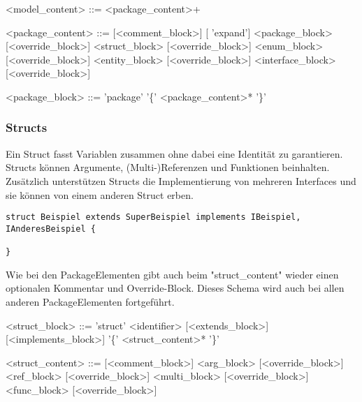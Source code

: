 \documentclass[./einleitung.tex]{subfiles}
\begin{document}
\begin{grammar}
<model_content> ::= <package_content>+

<package_content> ::= [<comment_block>] [ 'expand'] <package_block> [<override_block>]
 <struct_block> [<override_block>]
 <enum_block> [<override_block>]
 <entity_block> [<override_block>]
 <interface_block> [<override_block>]

<package_block> ::= 'package' '\{' <package_content>* '\}'
\end{grammar}

\subsubsection{Structs} Ein Struct fasst Variablen zusammen ohne dabei eine Identität zu garantieren. Structs können Argumente, (Multi-)Referenzen und Funktionen beinhalten.
Zusätzlich unterstützen Structs die Implementierung von mehreren Interfaces und sie können von einem anderen Struct erben.
\begin{lstlisting}
struct Beispiel extends SuperBeispiel implements IBeispiel, IAnderesBeispiel {

}
\end{lstlisting}
Wie bei den PackageElementen gibt auch beim "struct_content" wieder einen optionalen Kommentar und Override-Block. Dieses Schema wird auch bei allen anderen PackageElementen fortgeführt.
\begin{grammar}
<struct_block> ::= 'struct' <identifier> [<extends_block>] [<implements_block>] '\{' <struct_content>* '\}'

<struct_content> ::= [<comment_block>] <arg_block> [<override_block>]
 <ref_block> [<override_block>]
 <multi_block> [<override_block>]
 <func_block> [<override_block>]

\end{grammar}
\end{document}

